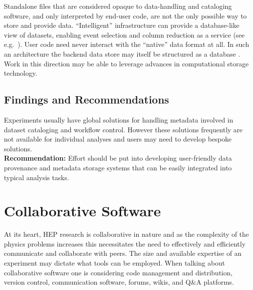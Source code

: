 Standalone files that are considered opaque to data-handling and cataloging software, and only interpreted by end-user code, are not the only possible way to store and provide data. ``Intelligent'' infrastructure can provide a database-like view of datasets, enabling event selection and column reduction as a service (see e.g.\ \cite{Galewsky:2020xig}). User code need never interact with the ``native'' data format at all. In such an architecture the backend data store may itself be structured as a database \cite{Gutsche:2020kmd}. Work in this direction may be able to leverage advances in computational storage technology.

\subsection{Findings and Recommendations}
Experiments usually have global solutions for handling metadata involved in dataset cataloging and workflow control. However these solutions frequently are not available for individual analyses and users may need to develop bespoke solutions.\\
\textbf{Recommendation:} Effort should be put into developing user-friendly data provenance and metadata storage systems that can be easily integrated into typical analysis tasks.

\section{Collaborative Software}
\begin{comment}
T. Aarrestad et al. [HEP Software Foundation], “HL-LHC Computing Review: Common Tools and Community Software”, arXiv:2008.13636 [physics.comp-ph ]] (pdf).~\cite{stewart_graeme_andrew_2020_4009114}

Simone Campana, Alessandro Di Girolamo, Paul Laycock, Zach Marshall, Heidi Schellman, Graeme A Stewart. ”HEP computing collaborations for the challenges of the next decade”, arXiv:2203.07237 [physics.comp-ph] (pdf).~\cite{arxiv.2203.07237}

Dave Casper, Maria Elena Monzani, Benjamin Nachman, Costas Andreopoulos, Stephen Bailey, Deborah Bard, et al. ”Software and Computing for Small HEP Experiments“, arXiv:2203.07645 [hep-ex] (pdf). (also under EF0, NF0, RF0, CF0)~\cite{arxiv.2203.07645}

\end{comment}

At its heart, HEP research is collaborative in nature and as the complexity of the physics problems increases this necessitates the need to effectively and efficiently communicate and collaborate with peers.
The size and available expertise of an experiment may dictate what tools can be employed. When talking about collaborative software one is considering code management and distribution, version control, communication software, forums, wikis, and Q\&A platforms.
